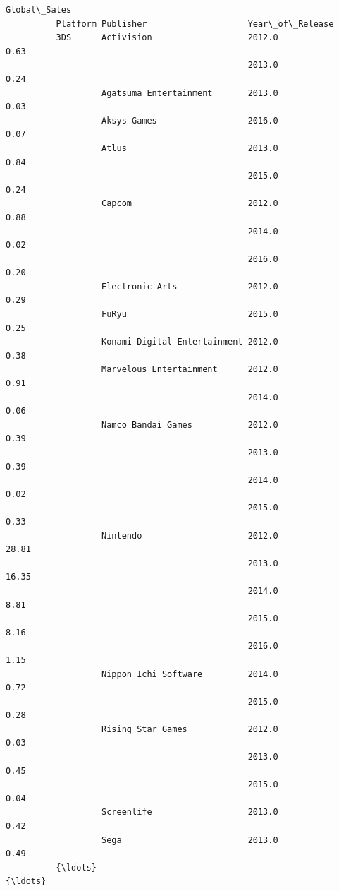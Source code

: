 \documentclass[11pt]{article}
\begin{document}
\begin{Verbatim}[commandchars=\\\{\}]
                                                                 Global\_Sales  
          Platform Publisher                    Year\_of\_Release                
          3DS      Activision                   2012.0                   0.63  
                                                2013.0                   0.24  
                   Agatsuma Entertainment       2013.0                   0.03  
                   Aksys Games                  2016.0                   0.07  
                   Atlus                        2013.0                   0.84  
                                                2015.0                   0.24  
                   Capcom                       2012.0                   0.88  
                                                2014.0                   0.02  
                                                2016.0                   0.20  
                   Electronic Arts              2012.0                   0.29  
                   FuRyu                        2015.0                   0.25  
                   Konami Digital Entertainment 2012.0                   0.38  
                   Marvelous Entertainment      2012.0                   0.91  
                                                2014.0                   0.06  
                   Namco Bandai Games           2012.0                   0.39  
                                                2013.0                   0.39  
                                                2014.0                   0.02  
                                                2015.0                   0.33  
                   Nintendo                     2012.0                  28.81  
                                                2013.0                  16.35  
                                                2014.0                   8.81  
                                                2015.0                   8.16  
                                                2016.0                   1.15  
                   Nippon Ichi Software         2014.0                   0.72  
                                                2015.0                   0.28  
                   Rising Star Games            2012.0                   0.03  
                                                2013.0                   0.45  
                                                2015.0                   0.04  
                   Screenlife                   2013.0                   0.42  
                   Sega                         2013.0                   0.49  
          {\ldots}                                                             {\ldots}  

\end{Verbatim}
\end{document}
